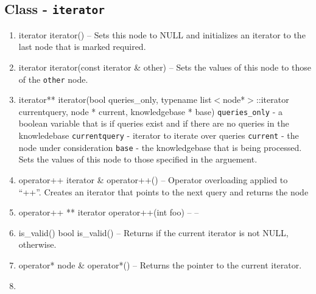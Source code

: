 \subsection{Class - \texttt{iterator}}
\begin{enumerate}
\item \begin{detail}
{iterator}
{iterator()}
{--}
{Sets this node to NULL and initializes an iterator to the last node that is marked required. } 
\end{detail}
\item \begin{detail}
{iterator}
{iterator(const iterator \& other)}
{--}
{Sets the values of this node to those of the \texttt{other} node.} 
\end{detail}
\item \begin{detail}
{iterator**}
{iterator(bool queries\_only, typename list$<$node*$>$::iterator currentquery, node * current, knowledgebase * base)}
{\texttt{queries\_only} - a boolean variable that is \true if queries exist and \false if there are no queries in the knowledebase
 \texttt{currentquery} - iterator to iterate over queries
 \texttt{current} - the node under consideration
 \texttt{base} - the knowledgebase that is being processed.}
{Sets the values of this node to those specified in the arguement.} 
\end{detail}
\item \begin{detail}
{operator++}
{iterator \& operator++()}
{--}
{Operator overloading applied to ``++''. Creates an iterator that points to the next query and returns the node} 
\end{detail}
\item \begin{detail}
{operator++ **}
{iterator operator++(int foo)}
{--}
{--} 
\end{detail}
\item \begin{detail}
{is\_valid()}
{bool is\_valid()}
{--}
{Returns \true if the current iterator is not NULL, \false otherwise.} 
\end{detail}
\item \begin{detail}
{operator*}
{node \& operator*()}
{--}
{Returns the pointer to the current iterator.} 
\end{detail}
\item \begin{detail}

\end{detail}
\end{enumerate}
